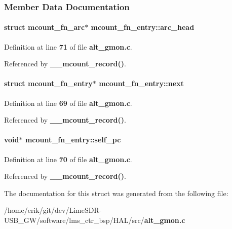 \subsubsection{Member Data Documentation}
\paragraph[{arc\+\_\+head}]{\setlength{\rightskip}{0pt plus 5cm}struct {\bf mcount\+\_\+fn\+\_\+arc}$\ast$ mcount\+\_\+fn\+\_\+entry\+::arc\+\_\+head}\label{structmcount__fn__entry_a2917ca0182fe934db8a353bf1ea69630}


Definition at line {\bf 71} of file {\bf alt\+\_\+gmon.\+c}.



Referenced by {\bf \+\_\+\+\_\+mcount\+\_\+record()}.

\paragraph[{next}]{\setlength{\rightskip}{0pt plus 5cm}struct {\bf mcount\+\_\+fn\+\_\+entry}$\ast$ mcount\+\_\+fn\+\_\+entry\+::next}\label{structmcount__fn__entry_a918133620698b6abd1d8cca84ea3c924}


Definition at line {\bf 69} of file {\bf alt\+\_\+gmon.\+c}.



Referenced by {\bf \+\_\+\+\_\+mcount\+\_\+record()}.

\paragraph[{self\+\_\+pc}]{\setlength{\rightskip}{0pt plus 5cm}void$\ast$ mcount\+\_\+fn\+\_\+entry\+::self\+\_\+pc}\label{structmcount__fn__entry_a898d5965d37741c8f9a19afb5635d196}


Definition at line {\bf 70} of file {\bf alt\+\_\+gmon.\+c}.



Referenced by {\bf \+\_\+\+\_\+mcount\+\_\+record()}.



The documentation for this struct was generated from the following file\+:\begin{DoxyCompactItemize}
\item 
/home/erik/git/dev/\+Lime\+S\+D\+R-\/\+U\+S\+B\+\_\+\+G\+W/software/lms\+\_\+ctr\+\_\+bsp/\+H\+A\+L/src/{\bf alt\+\_\+gmon.\+c}\end{DoxyCompactItemize}
